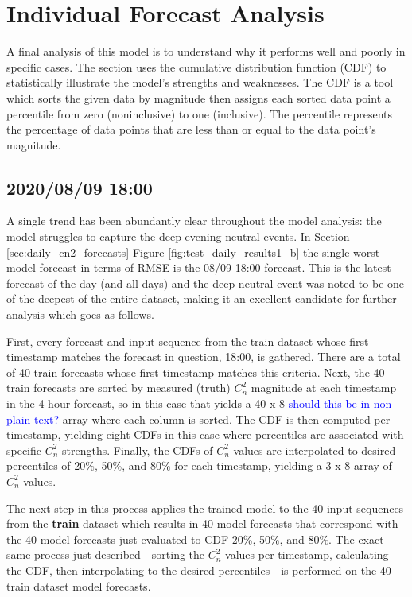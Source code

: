 \section{Individual Forecast Analysis}
A final analysis of this model is to understand why it performs well and poorly in specific cases. The section uses the cumulative distribution function (CDF) to statistically illustrate the model's strengths and weaknesses. The CDF is a tool which sorts the given data by magnitude then assigns each sorted data point a percentile from zero (noninclusive) to one (inclusive). The percentile represents the percentage of data points that are less than or equal to the data point's magnitude.

\subsection{2020/08/09 18:00}
A single trend has been abundantly clear throughout the model analysis: the model struggles to capture the deep evening neutral events. In Section \ref{sec:daily_cn2_forecasts} Figure \ref{fig:test_daily_results1_b} the single worst model forecast in terms of RMSE is the 08/09 18:00 forecast. This is the latest forecast of the day (and all days) and the deep neutral event was noted to be one of the deepest of the entire dataset, making it an excellent candidate for further analysis which goes as follows.

First, every forecast and input sequence from the train dataset whose first timestamp matches the forecast in question, 18:00, is gathered. There are a total of 40 train forecasts whose first timestamp matches this criteria. Next, the 40 train forecasts are sorted by measured (truth) $C_{n}^{2}$ magnitude at each timestamp in the 4-hour forecast, so in this case that yields a 40 x 8 \textcolor{blue}{should this be in non-plain text?} array where each column is sorted. The CDF is then computed per timestamp, yielding eight CDFs in this case where percentiles are associated with specific $C_{n}^{2}$ strengths. Finally, the CDFs of $C_{n}^{2}$ values are interpolated to desired percentiles of  20\%, 50\%, and 80\% for each timestamp, yielding a 3 x 8 array of $C_{n}^{2}$ values. 

The next step in this process applies the trained model to the 40 input sequences from the \textbf{train} dataset which results in 40 model forecasts that correspond with the 40 model forecasts just evaluated to CDF 20\%, 50\%, and 80\%. The exact same process just described - sorting the $C_{n}^{2}$ values per timestamp, calculating the CDF, then interpolating to the desired percentiles - is performed on the 40 train dataset model forecasts.

